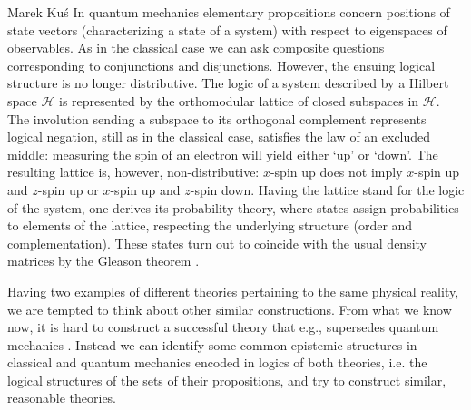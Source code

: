 \begin{artengenv}{Marek Ku\'s}
In quantum mechanics elementary propositions concern positions of state vectors (characterizing a state of a system) with respect to eigenspaces of observables. As in the classical case we can ask composite questions corresponding to conjunctions and disjunctions. However, the ensuing logical structure is no longer distributive. The logic of a system described by a  Hilbert space $\mathcal{H} $ is represented by the orthomodular lattice of  closed subspaces in $\mathcal{H}$. The involution sending a subspace to its  orthogonal complement represents logical negation, still as in the classical case, satisfies  the law  of an excluded middle: measuring the spin of an electron will yield either `up' or `down'. The  resulting lattice is, however,  non-distributive: $x$-spin up does not imply $x$-spin up and  $z$-spin up or $x$-spin up and $z$-spin down. Having the lattice stand for the logic of the system, one derives its probability theory, where  states assign probabilities to elements of the lattice, respecting the underlying structure (order and complementation). These states turn out to coincide with the usual density matrices by the Gleason theorem \parencite{kus_gleason_measures_1957}.


Having two examples of different theories pertaining to the same physical reality, we are tempted to think about other similar constructions. From what we know now, it is hard to construct a successful theory that e.g., supersedes quantum mechanics \parencite{aaronson_is_2004}. Instead we can identify some common epistemic structures in classical and quantum mechanics encoded in logics of both theories, i.e. the logical structures of the sets of their propositions, and try to construct similar, reasonable theories.


\end{artengenv}
